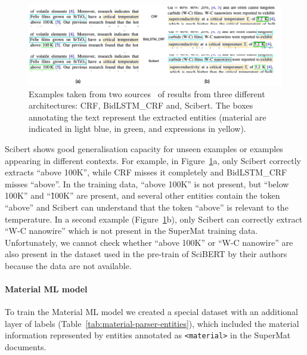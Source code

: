 \begin{figure}[ht]
    \centering
    \includegraphics[width=\textwidth]{figures/automatic_extraction_supercon/example-comparison-archs.png}
    \caption{Examples taken from two sources~\cite{Gajda_2016, Shibata_2016} of results from three different architectures: CRF, BidLSTM\_CRF and, Scibert. The boxes annotating the text represent the extracted entities (material are indicated in light blue, \tc in green, and \tc expressions in yellow).}
    \label{fig:example-comparison-architectures}
\end{figure}

Scibert shows good generalisation capacity for unseen examples or examples appearing in different contexts.
For example, in Figure~\ref{fig:example-comparison-architectures}a, only Scibert correctly extracts ``above 100K'', while CRF misses it completely and BidLSTM\_CRF misses ``above''.
In the training data, ``above 100K'' is not present, but ``below 100K'' and ``\~100K'' are present, and several other entities contain the token ``above'' and Scibert can understand that the token ``above'' is relevant to the temperature.
In a second example (Figure~\ref{fig:example-comparison-architectures}b), only Scibert can correctly extract ``W-C nanowire'' which is not present in the SuperMat training data.
Unfortunately, we cannot check whether ``above 100K'' or ``W-C nanowire'' are also present in the dataset used in the pre-train of SciBERT by their authors~\cite{Beltagy2019SciBERT} because the data are not available.

\paragraph*{Material ML model}

To train the Material ML model we created a special dataset with an additional layer of labels (Table~\ref{tab:material-parser-entities}), which included the material information represented by entities annotated as \texttt{<material>} in the SuperMat documents.

